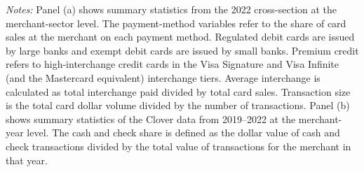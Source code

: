 \documentclass[11pt,english]{article}
\theoremstyle{remark}
\begin{document}
\begin{table}[H]
  \vspace{0.4em}
  \begin{minipage}{\linewidth}
    \textit{Notes:} Panel (a) shows summary statistics from the 2022 cross-section at the
    merchant-sector level. The payment-method variables refer to the share of card sales at the merchant
    on each payment method. Regulated debit cards are issued by large banks and exempt debit cards are issued
    by small banks. Premium credit refers to high-interchange credit cards in the Visa Signature and Visa
    Infinite (and the Mastercard equivalent) interchange tiers. Average interchange is calculated as total
    interchange paid divided by total card sales. Transaction size is the total card dollar volume divided by the
    number of transactions. Panel (b) shows summary statistics of the Clover data from 2019--2022 at the merchant-year
    level. The cash and check share is defined as the dollar value of cash and check transactions divided
    by the total value of transactions for the merchant in that year.
  \end{minipage}
\end{table}

\clearpage
\end{document}
